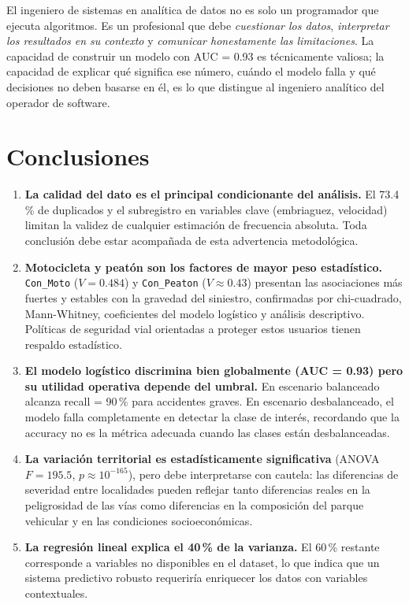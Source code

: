 \documentclass[11pt,a4paper]{article}
\begin{document}
El ingeniero de sistemas en analítica de datos no es solo un programador que ejecuta
algoritmos. Es un profesional que debe \textit{cuestionar los datos}, \textit{interpretar
los resultados en su contexto} y \textit{comunicar honestamente las limitaciones}. La
capacidad de construir un modelo con AUC = 0.93 es técnicamente valiosa; la capacidad de
explicar qué significa ese número, cuándo el modelo falla y qué decisiones no deben basarse
en él, es lo que distingue al ingeniero analítico del operador de software.

\section{Conclusiones}

\begin{enumerate}
  \item \textbf{La calidad del dato es el principal condicionante del análisis.} El 73.4\,\%
        de duplicados y el subregistro en variables clave (embriaguez, velocidad) limitan la
        validez de cualquier estimación de frecuencia absoluta. Toda conclusión debe estar
        acompañada de esta advertencia metodológica.

  \item \textbf{Motocicleta y peatón son los factores de mayor peso estadístico.}
        \texttt{Con\_Moto} ($V = 0.484$) y \texttt{Con\_Peaton} ($V \approx 0.43$)
        presentan las asociaciones más fuertes y estables con la gravedad del siniestro,
        confirmadas por chi-cuadrado, Mann-Whitney, coeficientes del modelo logístico y
        análisis descriptivo. Políticas de seguridad vial orientadas a proteger estos
        usuarios tienen respaldo estadístico.

  \item \textbf{El modelo logístico discrimina bien globalmente (AUC = 0.93) pero su
        utilidad operativa depende del umbral.} En escenario balanceado alcanza recall
        = 90\,\% para accidentes graves. En escenario desbalanceado, el modelo falla
        completamente en detectar la clase de interés, recordando que la accuracy no es
        la métrica adecuada cuando las clases están desbalanceadas.

  \item \textbf{La variación territorial es estadísticamente significativa} (ANOVA
        $F = 195.5$, $p \approx 10^{-165}$), pero debe interpretarse con cautela: las
        diferencias de severidad entre localidades pueden reflejar tanto diferencias reales
        en la peligrosidad de las vías como diferencias en la composición del parque
        vehicular y en las condiciones socioeconómicas.

  \item \textbf{La regresión lineal explica el 40\,\% de la varianza.} El 60\,\% restante
        corresponde a variables no disponibles en el dataset, lo que indica que un sistema
        predictivo robusto requeriría enriquecer los datos con variables contextuales.
\end{enumerate}
\end{document}
